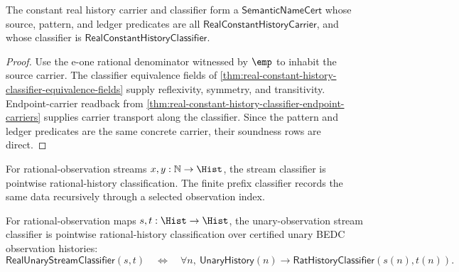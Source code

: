 \begin{theorem}
\label{thm:real-constant-history-semantic-namecert}
The constant real history carrier and classifier form a
$\mathsf{SemanticNameCert}$ whose source, pattern, and ledger predicates are all
$\mathsf{RealConstantHistoryCarrier}$, and whose classifier is
$\mathsf{RealConstantHistoryClassifier}$.
\end{theorem}
\begin{proof}
Use the e-one rational denominator witnessed by $\emp$ to inhabit the source
carrier. The classifier equivalence fields of
\autoref{thm:real-constant-history-classifier-equivalence-fields} supply
reflexivity, symmetry, and transitivity. Endpoint-carrier readback from
\autoref{thm:real-constant-history-classifier-endpoint-carriers} supplies
carrier transport along the classifier. Since the pattern and ledger predicates
are the same concrete carrier, their soundness rows are direct.
\end{proof}

\begin{definition}
\label{def:real-stream-classifiers}
For rational-observation streams $x,y:\mathbb{N}\to\Hist$, the stream classifier is pointwise rational-history classification. The finite prefix classifier records the same data recursively through a selected observation index.
\end{definition}

\begin{definition}
\label{def:real-unary-observation-stream-classifier}
For rational-observation maps $s,t:\Hist\to\Hist$, the unary-observation
stream classifier is pointwise rational-history classification over certified
unary BEDC observation histories:
$$
\mathsf{RealUnaryStreamClassifier}(s,t)
\quad\Longleftrightarrow\quad
\forall n,\ \mathsf{UnaryHistory}(n)\to
\mathsf{RatHistoryClassifier}(s(n),t(n)).
$$
\end{definition}


